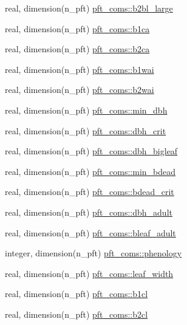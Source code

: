 \begin{DoxyCompactItemize}
\item 
real, dimension(n\+\_\+pft) \hyperlink{namespacepft__coms_a3047801affde1c1d10ddb8ceed1e6cb7}{pft\+\_\+coms\+::b2bl\+\_\+large}
\item 
real, dimension(n\+\_\+pft) \hyperlink{namespacepft__coms_a56ccfd1fc49345702eb25a9a9f4a5756}{pft\+\_\+coms\+::b1ca}
\item 
real, dimension(n\+\_\+pft) \hyperlink{namespacepft__coms_a2380072ccb1b4557283c4f7d44398c9c}{pft\+\_\+coms\+::b2ca}
\item 
real, dimension(n\+\_\+pft) \hyperlink{namespacepft__coms_ad8ddc641c836a1062e3157400b675217}{pft\+\_\+coms\+::b1wai}
\item 
real, dimension(n\+\_\+pft) \hyperlink{namespacepft__coms_a31ab705538ba69a865a41647d0bd5d63}{pft\+\_\+coms\+::b2wai}
\item 
real, dimension(n\+\_\+pft) \hyperlink{namespacepft__coms_a6290d41cd79d6f8ac7819f9bf06cad60}{pft\+\_\+coms\+::min\+\_\+dbh}
\item 
real, dimension(n\+\_\+pft) \hyperlink{namespacepft__coms_a39e1c4892ebafc9be2ac78b48d954d5c}{pft\+\_\+coms\+::dbh\+\_\+crit}
\item 
real, dimension(n\+\_\+pft) \hyperlink{namespacepft__coms_a86747c6ee955a89a55612d189bf255f8}{pft\+\_\+coms\+::dbh\+\_\+bigleaf}
\item 
real, dimension(n\+\_\+pft) \hyperlink{namespacepft__coms_af689fc3f0c233590c72175bf99d1c8f6}{pft\+\_\+coms\+::min\+\_\+bdead}
\item 
real, dimension(n\+\_\+pft) \hyperlink{namespacepft__coms_a321291df889682b63b1a09ff1affff18}{pft\+\_\+coms\+::bdead\+\_\+crit}
\item 
real, dimension(n\+\_\+pft) \hyperlink{namespacepft__coms_a5dbaccf1767dc343b4dca7f5e25f358b}{pft\+\_\+coms\+::dbh\+\_\+adult}
\item 
real, dimension(n\+\_\+pft) \hyperlink{namespacepft__coms_a032c88698720a94f7bdeff271ae39844}{pft\+\_\+coms\+::bleaf\+\_\+adult}
\item 
integer, dimension(n\+\_\+pft) \hyperlink{namespacepft__coms_a5a3bbf23e4825378c0f3c8bd788c6c68}{pft\+\_\+coms\+::phenology}
\item 
real, dimension(n\+\_\+pft) \hyperlink{namespacepft__coms_ac9aba7609beabf8387afac8a12a89d5c}{pft\+\_\+coms\+::leaf\+\_\+width}
\item 
real, dimension(n\+\_\+pft) \hyperlink{namespacepft__coms_ad31da22766c6db6bf3f24498eab8d22d}{pft\+\_\+coms\+::b1cl}
\item 
real, dimension(n\+\_\+pft) \hyperlink{namespacepft__coms_a382f054406a23a234b101ebf06ff6d5c}{pft\+\_\+coms\+::b2cl}

\end{DoxyCompactItemize}
